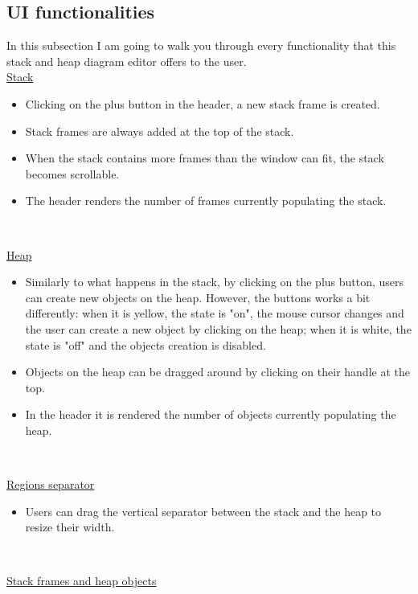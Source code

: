 \documentclass[]{usiinfbachelorproject}
\begin{document}
\vspace{\fill}
\pagebreak

\subsection{UI functionalities}

In this subsection I am going to walk you through every functionality that this stack and heap diagram editor offers to the user.\\

\ul{Stack}

\begin{itemize}
	\item Clicking on the plus button in the header, a new stack frame is created.
	\item Stack frames are always added at the top of the stack.
	\item When the stack contains more frames than the window can fit, the stack becomes scrollable. 
	\item The header renders the number of frames currently populating the stack.
\end{itemize}\

\ul{Heap}

\begin{itemize}
	\item Similarly to what happens in the stack, by clicking on the plus button, users can create new objects on the heap. However, the buttons works a bit differently: when it is yellow, the state is "on", the mouse cursor changes and the user can create a new object by clicking on the heap; when it is white, the state is "off" and the objects creation is disabled.
	\item Objects on the heap can be dragged around by clicking on their handle at the top.
	\item In the header it is rendered the number of objects currently populating the heap.
\end{itemize}\

\ul{Regions separator}

\begin{itemize}
	\item Users can drag the vertical separator between the stack and the heap to resize their width.
\end{itemize}\

\ul{Stack frames and heap objects}
\end{document}

